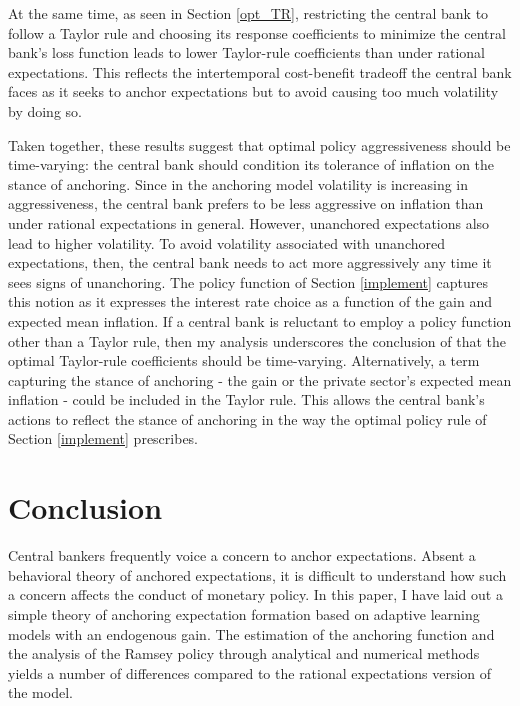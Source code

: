 \documentclass[11pt]{article}
\renewcommand{\[}{\begin{equation}}
\renewcommand{\]}{\end{equation}}
\begin{document}
At the same time, as seen in Section \ref{opt_TR}, restricting the central bank to follow a Taylor rule and choosing its response coefficients to minimize the central bank's loss function leads to lower Taylor-rule coefficients than under rational expectations. This reflects the intertemporal cost-benefit tradeoff the central bank faces as it seeks to anchor expectations but to avoid causing too much volatility by doing so.  

Taken together, these results suggest that optimal policy aggressiveness should be time-varying: the central bank should condition its tolerance of inflation on the stance of anchoring. Since in the anchoring model volatility is increasing in aggressiveness, the central bank prefers to be less aggressive on inflation than under rational expectations in general. However, unanchored expectations also lead to higher volatility. To avoid volatility associated with unanchored expectations, then, the central bank needs to act more aggressively any time it sees signs of  unanchoring. The policy function of Section \ref{implement} captures this notion as it expresses the interest rate choice as a function of the gain and expected mean inflation. If a central bank is reluctant to employ a policy function other than a Taylor rule, then my analysis underscores the conclusion of \cite{LUBIK201685} that the optimal Taylor-rule coefficients should be time-varying. Alternatively, a term capturing the stance of anchoring - the gain or the private sector's expected mean inflation - could be included in the Taylor rule. This allows the central bank's actions to reflect the stance of anchoring in the way the optimal policy rule of Section \ref{implement} prescribes. 



\section{Conclusion}\label{conclusion}
Central bankers frequently voice a concern to anchor expectations. Absent a behavioral theory of anchored expectations, it is difficult to understand how such a concern affects the conduct of monetary policy. In this paper, I have laid out a simple theory of anchoring expectation formation based on adaptive learning models with an endogenous gain. The estimation of the anchoring function and the analysis of the Ramsey policy through analytical and numerical methods yields a number of differences compared to the rational expectations version of the model. 
\end{document}
